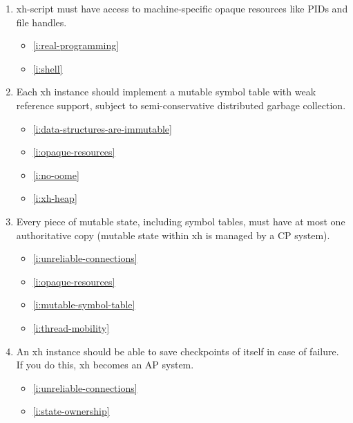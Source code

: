 \documentclass{report}
\makeatletter
\newcommand*{\Label}[2]{%
  \@bsphack
  \begingroup
    \label{#1-original}%
    \def\@currentlabel{#2 [\ref{#1-original}]}%
    \label{#1}%
  \endgroup
  \@esphack
}
\makeatother
\begin{document}
\begin{enumerate}
\item{}\Label{i:opaque-resources}{opaques}
  xh-script must have access to machine-specific opaque resources like PIDs
  and file handles.
\begin{itemize}
\item \ref{i:real-programming}
\item \ref{i:shell}
\end{itemize}
\item{}\Label{i:mutable-symbol-table}{mutablesyms}
  Each xh instance should implement a mutable symbol table with weak
  reference support, subject to semi-conservative distributed garbage
  collection.
\begin{itemize}
\item \ref{i:data-structures-are-immutable}
\item \ref{i:opaque-resources}
\item \ref{i:no-oome}
\item \ref{i:xh-heap}
\end{itemize}
\item{}\Label{i:state-ownership}{stateown}
  Every piece of mutable state, including symbol tables, must have at most
  one authoritative copy (mutable state within xh is managed by a CP
  system).
\begin{itemize}
\item \ref{i:unreliable-connections}
\item \ref{i:opaque-resources}
\item \ref{i:mutable-symbol-table}
\item \ref{i:thread-mobility}
\end{itemize}
\item{}\Label{i:checkpointing}{checkpoint}
  An xh instance should be able to save checkpoints of itself in case of
  failure. If you do this, xh becomes an AP system.
\begin{itemize}
\item \ref{i:unreliable-connections}
\item \ref{i:state-ownership}
\end{itemize}


\end{enumerate}
\end{document}
